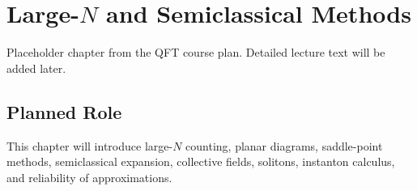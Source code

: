 \chapter{Large-\(N\) and Semiclassical Methods}

\begin{remarkbox}
Placeholder chapter from the QFT course plan. Detailed lecture text will be added later.
\end{remarkbox}

\section{Planned Role}

This chapter will introduce large-\(N\) counting, planar diagrams, saddle-point methods, semiclassical expansion, collective fields, solitons, instanton calculus, and reliability of approximations.
